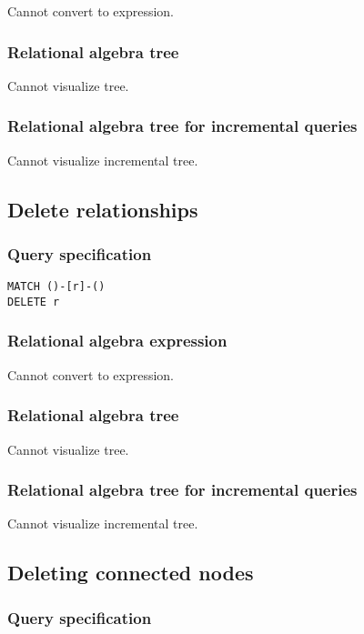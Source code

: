 Cannot convert to expression.

\subsubsection*{Relational algebra tree}

Cannot visualize tree.

\subsubsection*{Relational algebra tree for incremental queries}

Cannot visualize incremental tree.

\subsection{Delete relationships}

\subsubsection*{Query specification}

\begin{lstlisting}
MATCH ()-[r]-()
DELETE r
\end{lstlisting}

\subsubsection*{Relational algebra expression}

Cannot convert to expression.

\subsubsection*{Relational algebra tree}

Cannot visualize tree.

\subsubsection*{Relational algebra tree for incremental queries}

Cannot visualize incremental tree.

\subsection{Deleting connected nodes}

\subsubsection*{Query specification}

